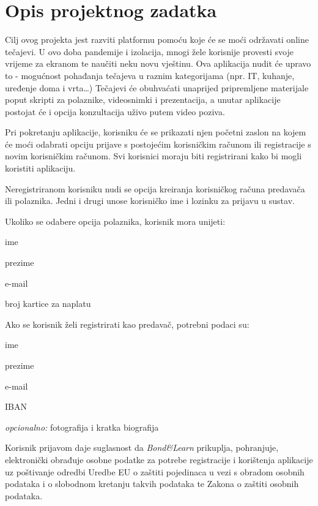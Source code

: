 \chapter{Opis projektnog zadatka}
		
		\text Cilj ovog projekta jest razviti platformu pomoću koje će se moći održavati online tečajevi. U ovo doba pandemije i izolacija, mnogi žele korisnije provesti svoje vrijeme za ekranom te naučiti neku novu vještinu. Ova aplikacija nudit će upravo to - mogućnost pohađanja tečajeva u raznim kategorijama (npr. IT, kuhanje, uređenje doma i vrta…) Tečajevi će obuhvaćati unaprijed pripremljene materijale poput skripti za polaznike, videosnimki i prezentacija, a unutar aplikacije postojat će i opcija konzultacija uživo putem video poziva.
		
		Pri pokretanju aplikacije, korisniku će se prikazati njen početni zaslon na kojem će moći odabrati opciju prijave s postojećim korisničkim računom ili registracije s novim korisničkim računom. Svi korisnici moraju biti registrirani kako bi mogli koristiti aplikaciju. 
		
		Neregistriranom korisniku nudi se opcija kreiranja korisničkog računa predavača ili polaznika. Jedni i drugi unose korisničko ime i lozinku za prijavu u sustav.
		
		Ukoliko se odabere opcija polaznika, korisnik mora unijeti:
		\begin{packed_item}
			\item ime
			\item prezime
			\item e-mail
			\item broj kartice za naplatu
		\end{packed_item}
	
	Ako se korisnik želi registrirati kao predavač, potrebni podaci su:
		\begin{packed_item}
			\item ime
			\item prezime
			\item e-mail
			\item IBAN
			\item \textit{opcionalno:} fotografija i kratka biografija
		\end{packed_item}
	Korisnik prijavom daje suglasnost da \textit{Bond\&Learn} prikuplja, pohranjuje, elektronički obrađuje osobne podatke za potrebe registracije i korištenja aplikacije uz poštivanje odredbi Uredbe EU o zaštiti pojedinaca u vezi s obradom osobnih podataka i o slobodnom kretanju takvih podataka te Zakona o zaštiti osobnih podataka.
	
